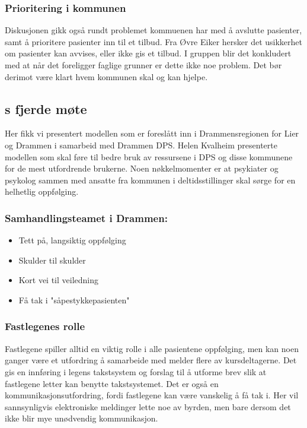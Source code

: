 \documentclass[11pt]{report} %
\begin{document}
                    \subsubsection{Prioritering i kommunen}
                    Diskusjonen gikk også rundt problemet kommuenen har med å avslutte pasienter, samt å prioritere pasienter inn til et tilbud. Fra Øvre Eiker hersker det usikkerhet om pasienter kan avvises, eller ikke gis et tilbud. I gruppen blir det konkludert med at når det foreligger faglige grunner er dette ikke noe problem. Det bør derimot være klart hvem kommunen skal og kan hjelpe.

                  \subsection{s fjerde møte}\label{sec:agr_4}
                    Her fikk vi presentert modellen som er foreslått inn i Drammensregionen for Lier og Drammen i samarbeid med Drammen DPS. Helen Kvalheim presenterte modellen som skal føre til bedre bruk av ressursene i DPS og disse kommunene for de mest utfordrende brukerne. Noen nøkkelmomenter er at psykiater og psykolog sammen med ansatte fra kommunen i deltidsstillinger skal sørge for en helhetlig oppfølging. 
                    \subsubsection{Samhandlingsteamet i Drammen:}
                     \begin{itemize}
                      \item Tett på, langsiktig oppfølging\\
                      \item Skulder til skulder\\
                      \item Kort vei til veiledning\\
                      \item Få tak i "såpestykkepasienten"\\
                     \end{itemize}
                    \subsubsection{Fastlegenes rolle}
                      Fastlegene spiller alltid en viktig rolle i alle pasientene oppfølging, men kan noen ganger være et utfordring å samarbeide med melder flere av kursdeltagerne. Det gis en innføring i legens takstsystem og forslag til å utforme brev slik at fastlegene letter kan benytte takstsystemet. Det er også en kommunikasjonsutfordring, fordi fastlegene kan være vanskelig å få tak i. Her vil sannsynligvis elektroniske meldinger lette noe av byrden, men bare dersom det ikke blir mye unødvendig kommunikasjon.
\end{document}
